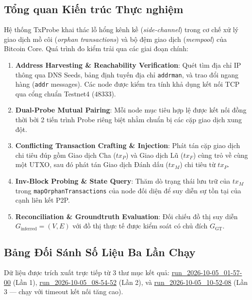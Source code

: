 \documentclass[11pt,a4paper]{article}
\begin{document}
\subsection{Tổng quan Kiến trúc Thực nghiệm}
Hệ thống TxProbe khai thác lỗ hổng kênh kề (\textit{side-channel}) trong cơ chế xử lý giao dịch mồ côi (\textit{orphan transactions}) và bộ đệm giao dịch (\textit{mempool}) của Bitcoin Core. Quá trình đo kiểm trải qua các giai đoạn chính:
\begin{enumerate}
    \item \textbf{Address Harvesting \& Reachability Verification}: Quét tìm địa chỉ IP thông qua DNS Seeds, bảng định tuyến địa chỉ \texttt{addrman}, và trao đổi ngang hàng (\texttt{addr} messages). Các node được kiểm tra tính khả dụng kết nối TCP qua cổng chuẩn Testnet4 ($48333$).
    \item \textbf{Dual-Probe Mutual Pairing}: Mỗi node mục tiêu hợp lệ được kết nối đồng thời bởi 2 tiến trình Probe riêng biệt nhằm chuẩn bị các cặp giao dịch xung đột.
    \item \textbf{Conflicting Transaction Crafting \& Injection}: Phát tán cặp giao dịch chi tiêu đúp gồm Giao dịch Cha ($tx_P$) và Giao dịch Lũ ($tx_F$) cùng trỏ về cùng một UTXO, sau đó phát tán Giao dịch Đánh dấu ($tx_M$) chi tiêu từ $tx_P$.
    \item \textbf{Inv-Block Probing \& State Query}: Thăm dò trạng thái lưu trữ của $tx_M$ trong \texttt{mapOrphanTransactions} của node đối diện để suy diễn sự tồn tại của cạnh liên kết P2P.
    \item \textbf{Reconciliation \& Groundtruth Evaluation}: Đối chiếu đồ thị suy diễn $G_{\text{inferred}}=(V, E)$ với đồ thị thực tế được kiểm soát có chủ đích $G_{\text{GT}}$.
\end{enumerate}

\subsection{Bảng Đối Sánh Số Liệu Ba Lần Chạy}
Dữ liệu được trích xuất trực tiếp từ 3 thư mục kết quả:
\url{run_2026-10-05_01-57-00} (Lần 1),
\url{run_2026-10-05_08-54-52} (Lần 2),
và \url{run_2026-10-05_10-52-08} (Lần 3 --- chạy với timeout kết nối tăng cao).
\end{document}
